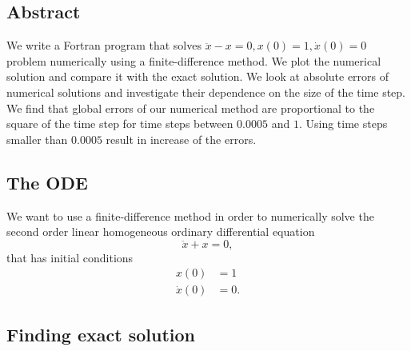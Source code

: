 \subsection{Abstract}

We write a Fortran program that solves $\ddot{x} - x = 0, x(0)=1, \dot{x}(0)=0$ problem numerically using a finite-difference method. We plot the numerical solution and compare it with the exact solution. We look at absolute errors of numerical solutions and investigate their dependence on the size of the time step. We find that global errors of our numerical method are proportional to the square of the time step for time steps between $0.0005$ and $1$. Using time steps smaller than $0.0005$ result in increase of the errors.

\subsection{The ODE}

We want to use a finite-difference method in order to numerically solve the second order linear homogeneous ordinary differential equation
\begin{equation}
  \ddot{x} + x = 0,
  \label{eq_ode}
\end{equation}
that has initial conditions
\begin{align}
  x(0) &= 1 \label{eq_ode_condition_one} \\
  \dot{x}(0) &= 0. \label{eq_ode_condition_two}
\end{align}



\subsection{Finding exact solution}

